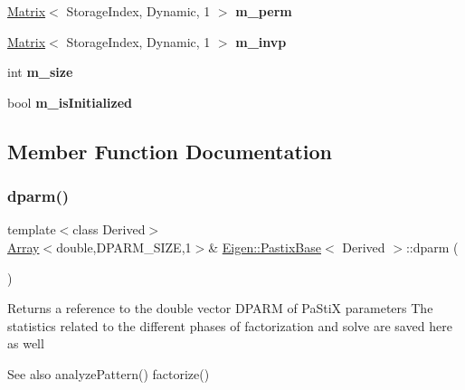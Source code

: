 \begin{DoxyCompactItemize}
\mbox{\hyperlink{class_eigen_1_1_matrix}{Matrix}}$<$ Storage\+Index, Dynamic, 1 $>$ {\bfseries m\+\_\+perm}
\item 
\mbox{\label{class_eigen_1_1_pastix_base_a2a78525b0cfe2bbf28e03e2e90077748}} 
\mbox{\hyperlink{class_eigen_1_1_matrix}{Matrix}}$<$ Storage\+Index, Dynamic, 1 $>$ {\bfseries m\+\_\+invp}
\item 
\mbox{\label{class_eigen_1_1_pastix_base_ab687f32875f2ff3e723d5b19584d533e}} 
int {\bfseries m\+\_\+size}
\item 
\mbox{\label{class_eigen_1_1_pastix_base_ac52101f69d048d5c4b036eadf1f13673}} 
bool {\bfseries m\+\_\+is\+Initialized}
\end{DoxyCompactItemize}


\subsection{Member Function Documentation}
\mbox{\label{class_eigen_1_1_pastix_base_af4a29373aa3e6a980738efde33f92a76}} 
\subsubsection{\texorpdfstring{dparm()}{dparm()}\hspace{0.1cm}{\footnotesize\ttfamily [1/2]}}
{\footnotesize\ttfamily template$<$class Derived$>$ \\
\mbox{\hyperlink{class_eigen_1_1_array}{Array}}$<$double,D\+P\+A\+R\+M\+\_\+\+S\+I\+ZE,1$>$\& \mbox{\hyperlink{class_eigen_1_1_pastix_base}{Eigen\+::\+Pastix\+Base}}$<$ Derived $>$\+::dparm (\begin{DoxyParamCaption}{ }\end{DoxyParamCaption})\hspace{0.3cm}{\ttfamily [inline]}}

Returns a reference to the double vector D\+P\+A\+RM of Pa\+StiX parameters The statistics related to the different phases of factorization and solve are saved here as well \begin{DoxySeeAlso}{See also}
analyze\+Pattern() factorize() 
\end{DoxySeeAlso}
\mbox{\label{class_eigen_1_1_pastix_base_a6e7baecd4990d6df9b5713cb6499e940}} 
